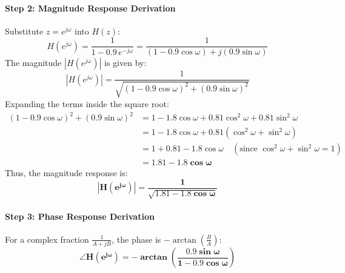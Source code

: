 \documentclass[11pt,a4paper]{article}
\begin{document}
\paragraph{Step 2: Magnitude Response Derivation}
Substitute $z = e^{j\omega}$ into $H(z)$:
\begin{equation}
    H(e^{j\omega}) = \frac{1}{1 - 0.9\,e^{-j\omega}} = \frac{1}{(1 - 0.9\cos\omega) + j(0.9\sin\omega)}
\end{equation}
The magnitude $|H(e^{j\omega})|$ is given by:
\begin{equation}
    |H(e^{j\omega})| = \frac{1}{\sqrt{(1 - 0.9\cos\omega)^2 + (0.9\sin\omega)^2}}
\end{equation}
Expanding the terms inside the square root:
\begin{align}
    (1 - 0.9\cos\omega)^2 + (0.9\sin\omega)^2 &= 1 - 1.8\cos\omega + 0.81\cos^2\omega + 0.81\sin^2\omega \nonumber \\
    &= 1 - 1.8\cos\omega + 0.81(\cos^2\omega + \sin^2\omega) \nonumber \\
    &= 1 + 0.81 - 1.8\cos\omega \quad (\text{since } \cos^2\omega + \sin^2\omega = 1) \nonumber \\
    &= \mathbf{1.81 - 1.8\cos\omega}
\end{align}
Thus, the magnitude response is:
\begin{equation}
    \mathbf{|H(e^{j\omega})| = \frac{1}{\sqrt{1.81 - 1.8\cos\omega}}}
\end{equation}

\paragraph{Step 3: Phase Response Derivation}
For a complex fraction $\frac{1}{A + jB}$, the phase is $-\arctan\left(\frac{B}{A}\right)$:
\begin{equation}
    \mathbf{\angle H(e^{j\omega}) = -\arctan\left(\frac{0.9\sin\omega}{1 - 0.9\cos\omega}\right)}
\end{equation}
\end{document}

